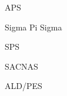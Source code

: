 
\begin{cvskills}

    \cvskill
    {APS}
    {}

    \cvskill
    {Sigma Pi Sigma}
    {}

    \cvskill
    {SPS}
    {}

    \cvskill
    {SACNAS}
    {}

    \cvskill
    {ALD/PES}
    {}
\end{cvskills}
